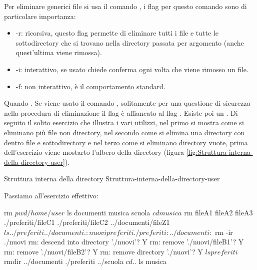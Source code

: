 Per eliminare generici file si usa il comando , i flag per questo comando sono di particolare importanza:
\begin{itemize}
    \item -r: ricorsiva, questo flag permette di eliminare tutti i file e tutte le sottodirectory che si trovano nella directory passata per argomento (anche quest'ultima viene rimossa).
    \item -i: interattivo, se usato chiede conferma ogni volta che viene rimosso un file.
    \item -f: non interattivo, è il comportamento standard.
\end{itemize}
Quando . Se viene usato il comando , solitamente per una questione di sicurezza nella procedura di eliminazione il flag  è affiancato al flag . Esiste poi un . Di seguito il solito esercizio che illustra i vari utilizzi, nel primo si mostra come si eliminano più  file non directory, nel secondo come si elimina una directory con dentro file e sottodirectory e nel terzo come si eliminano directory vuote, prima dell'esercizio viene mostarto l'albero della directory  (figura \ref{fig:Struttura-interna-della-directory-user}).
\begin{figtree}{Struttura interna della directory }{Struttura-interna-della-directory-user}
\end{figtree}

Passiamo all'esercizio effettivo:
\begin{cmdc}{}{rm}
	$ pwd
	/home/user
	$ ls
	documenti musica scuola
	$ cd musica
	$ rm fileA1 fileA2 fileA3 ./preferiti/fileC1 ./preferiti/fileC2 ../documenti/fileZ1
	$ ls . ./preferiti ../documenti
	.:
	nuovi preferiti
	./preferiti:
	
	../documenti:
	$ rm -ir ./nuovi
	rm: descend into directory './nuovi'? Y
	rm: remove './nuovi/fileB1'? Y
	rm: remove './nuovi/fileB2'? Y
	rm: remove directory './nuovi'? Y
	$ ls
	preferiti
	$ rmdir ../documenti ./preferiti ../scuola
	$ cd ..
	$ ls
	musica
\end{cmdc}

